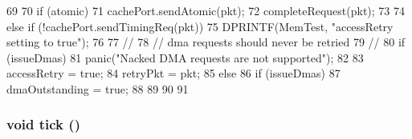 \begin{DoxyCode}
69                               {
70     if (atomic) {
71         cachePort.sendAtomic(pkt);
72         completeRequest(pkt);
73     }
74     else if (!cachePort.sendTimingReq(pkt)) {
75         DPRINTF(MemTest, "accessRetry setting to true\n");
76 
77         //
78         // dma requests should never be retried
79         //
80         if (issueDmas) {
81             panic("Nacked DMA requests are not supported\n");
82         }
83         accessRetry = true;
84         retryPkt = pkt;
85     } else {
86         if (issueDmas) {
87             dmaOutstanding = true;
88         }
89     }
90 
91 }
\end{DoxyCode}
\hypertarget{classMemTest_a873dd91783f9efb4a590aded1f70d6b0}{
\subsubsection[{tick}]{\setlength{\rightskip}{0pt plus 5cm}void tick ()}}
\label{classMemTest_a873dd91783f9efb4a590aded1f70d6b0}



